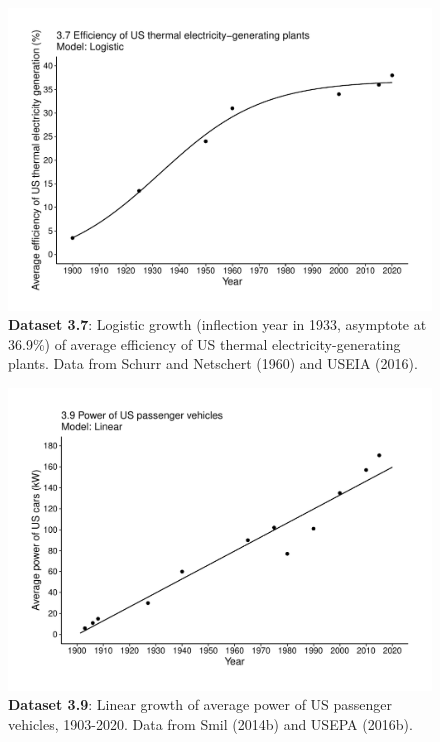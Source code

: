 \documentclass[aps,rmp,preprint,superscriptaddress,10pt,onecolumn]{article}
\begin{document}
\clearpage
\begin{figure}[h]
\includegraphics[width=\textwidth]{output/figs-ggplot/3.7.pdf}
\caption{\textbf{Dataset 3.7}: Logistic growth (inflection year in 1933, asymptote at 36.9\%) of average efficiency of US thermal electricity-generating plants. Data from Schurr and Netschert (1960) and USEIA (2016).}
\end{figure}
	
\clearpage
\begin{figure}[h]
\includegraphics[width=\textwidth]{output/figs-ggplot/3.9.pdf}
\caption{\textbf{Dataset 3.9}: Linear growth of average power of US passenger vehicles, 1903-2020. Data from Smil (2014b) and USEPA (2016b).}
\end{figure}
	
\end{document}
